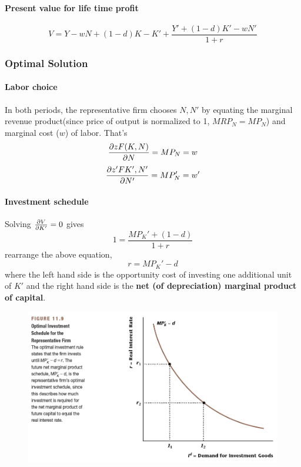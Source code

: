 \documentclass[11pt]{article}
\begin{document}
				\paragraph{Present value for life time profit}
					\begin{equation}
						V = Y - wN + (1-d)K - K' + \frac{Y' + (1-d)K' - wN'}{1+r}
					\end{equation}
					
				\subsubsection{Optimal Solution}
					\paragraph{Labor choice} In both periods, the representative firm chooses $N, N'$ by equating the marginal revenue product(since price of output is normalized to 1, $MRP_N = MP_N$) and marginal cost ($w$) of labor. That's
					\begin{equation}
						\frac{\partial{zF(K, N)}}{\partial{N}} = MP_N = w
					\end{equation}
					\begin{equation}
						\frac{\partial{z'F{K', N'}}}{\partial{N'}} = MP_N' = w' 
					\end{equation}
					
					\paragraph{Investment schedule} Solving $\frac{\partial{V}}{\partial{K'}} = 0$ gives
					\begin{equation}
						1 = \frac{MP_K'+(1-d)}{1+r}
					\end{equation}
					rearrange the above equation,
					\begin{equation}
						r = MP_K' - d
					\end{equation}
					where the left hand side is the opportunity cost of investing one additional unit of $K'$ and the right hand side is the \textbf{net (of depreciation) marginal product of capital}.
					
					\begin{figure}[h]
						\centering
						\includegraphics[width=\linewidth]{figures/119}
					\end{figure}
					
\end{document}
